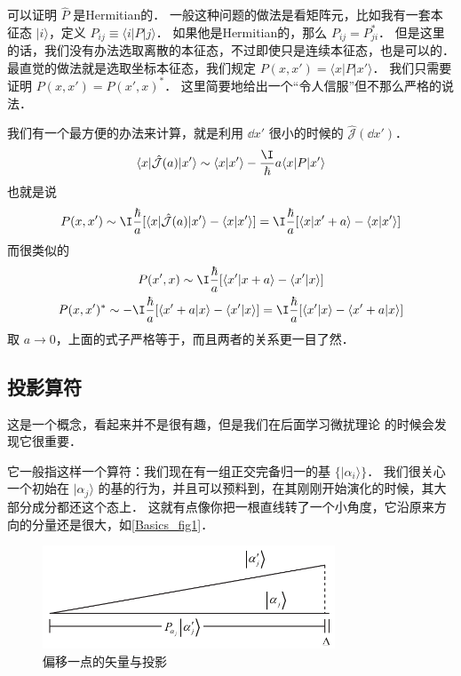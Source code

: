 \begin{example}{}
可以证明 $\hat{P}$ 是Hermitian的． 一般这种问题的做法是看矩阵元，比如我有一套本征态 $|i\rangle$，定义 $P_{ij} \equiv \langle i|P|j\rangle$． 如果他是Hermitian的，那么 $P_{ij} = P_{ji}^*$． 但是这里的话，我们没有办法选取离散的本征态，不过即使只是连续本征态，也是可以的． 最直觉的做法就是选取坐标本征态，我们规定 $P(x,x') = \langle x|P|x'\rangle$． 我们只需要证明 $P(x,x') = P(x',x)^*$． 这里简要地给出一个“令人信服”但不那么严格的说法．

我们有一个最方便的办法来计算，就是利用 $\dd{x'}$ 很小的时候的 $\hat{\mathcal{J}}(\dd{x'})$．
\begin{equation}
\langle x|\hat{\mathcal{J}}(a)|x'\rangle \sim \langle x|x'\rangle - \frac{\I}{\hbar} a \langle x|P|x'\rangle
\end{equation}
也就是说
\begin{equation}
P(x,x') \sim \I\frac{\hbar}{a}[\langle x|\hat{\mathcal{J}}(a)|x'\rangle - \langle x|x'\rangle] = \I\frac{\hbar}{a}[\langle x|x'+a\rangle - \langle x|x'\rangle]
\end{equation}
而很类似的
\begin{gather}
P(x',x) \sim \I\frac{\hbar}{a}[\langle x'|x+a\rangle - \langle x'|x\rangle]\\
P(x,x')^* \sim -\I\frac{\hbar}{a} [\langle x'+a|x\rangle - \langle x'|x\rangle] = \I\frac{\hbar}{a} [\langle x'|x\rangle - \langle x'+a|x\rangle]
\end{gather}
取 $a\rightarrow0$，上面的式子严格等于，而且两者的关系更一目了然．
\end{example}

\subsection{投影算符}

这是一个概念，看起来并不是很有趣，但是我们在后面学习微扰理论%
的时候会发现它很重要．

它一般指这样一个算符：我们现在有一组正交完备归一的基 $\{|\alpha_i\rangle\}$． 我们很关心一个初始在 $|\alpha_j\rangle$ 的基的行为，并且可以预料到，在其刚刚开始演化的时候，其大部分成分都还这个态上． 这就有点像你把一根直线转了一个小角度，它沿原来方向的分量还是很大，如\autoref{Basics_fig1}．

\begin{figure}[ht]
\centering
\includegraphics[width=8.7cm]{./figures/Basics1.pdf}
\caption{偏移一点的矢量与投影} \label{Basics_fig1}
\end{figure}

